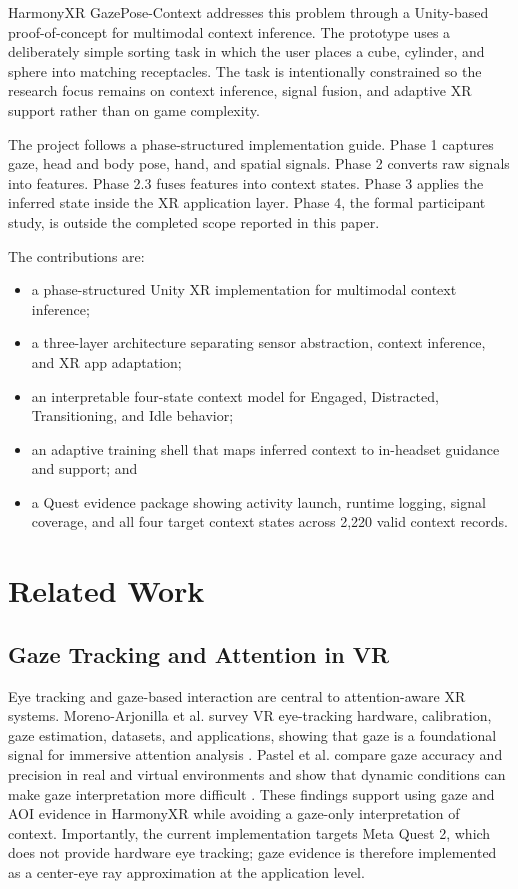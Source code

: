 \documentclass[conference]{IEEEtran}
\begin{document}
HarmonyXR GazePose-Context addresses this problem through a Unity-based proof-of-concept for multimodal context inference. The prototype uses a deliberately simple sorting task in which the user places a cube, cylinder, and sphere into matching receptacles. The task is intentionally constrained so the research focus remains on context inference, signal fusion, and adaptive XR support rather than on game complexity.

The project follows a phase-structured implementation guide. Phase 1 captures gaze, head and body pose, hand, and spatial signals. Phase 2 converts raw signals into features. Phase 2.3 fuses features into context states. Phase 3 applies the inferred state inside the XR application layer. Phase 4, the formal participant study, is outside the completed scope reported in this paper.

The contributions are:
\begin{itemize}
\item a phase-structured Unity XR implementation for multimodal context inference;
\item a three-layer architecture separating sensor abstraction, context inference, and XR app adaptation;
\item an interpretable four-state context model for Engaged, Distracted, Transitioning, and Idle behavior;
\item an adaptive training shell that maps inferred context to in-headset guidance and support; and
\item a Quest evidence package showing activity launch, runtime logging, signal coverage, and all four target context states across 2,220 valid context records.
\end{itemize}

\section{Related Work}
\subsection{Gaze Tracking and Attention in VR}
Eye tracking and gaze-based interaction are central to attention-aware XR systems. Moreno-Arjonilla et al. survey VR eye-tracking hardware, calibration, gaze estimation, datasets, and applications, showing that gaze is a foundational signal for immersive attention analysis \cite{moreno2024eyetracking}. Pastel et al. compare gaze accuracy and precision in real and virtual environments and show that dynamic conditions can make gaze interpretation more difficult \cite{pastel2021gaze}. These findings support using gaze and AOI evidence in HarmonyXR while avoiding a gaze-only interpretation of context. Importantly, the current implementation targets Meta Quest 2, which does not provide hardware eye tracking; gaze evidence is therefore implemented as a center-eye ray approximation at the application level.
\end{document}
